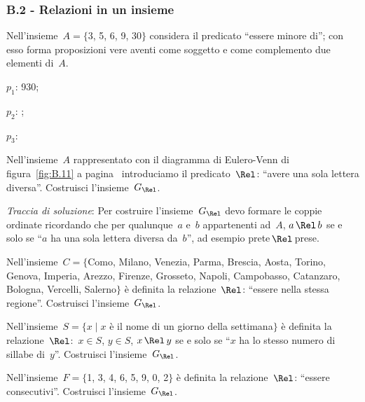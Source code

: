\begin{multicols}{2}
\subsubsection*{B.2 - Relazioni in un insieme}
\begin{esercizio}
\label{ese:B.2}
Nell'insieme~$A = \{$3, 5, 6, 9, 30$\}$ considera il predicato ``essere minore di''; con esso forma proposizioni vere aventi come soggetto e come complemento due elementi di~$A$.
\begin{enumeratea}
\item $p_1$: 930;
\item $p_2$: \dotfill;
\item $p_3$: \dotfill
\end{enumeratea}
\end{esercizio}

\begin{esercizio}
\label{ese:B.3}
Nell'insieme~$A$ rappresentato con il diagramma di Eulero-Venn di figura~\ref{fig:B.11} a pagina~\pageref{fig:B.11} introduciamo il predicato~$\Rel$: ``avere
una sola lettera diversa''. Costruisci l'insieme~$G_\Rel$.

\emph{Traccia di soluzione}:
Per costruire l'insieme~$G_\Rel$ devo formare le coppie ordinate ricordando che per qualunque~$a$ e~$b$ appartenenti ad~$A$, $a \,\Rel\, b$
se e solo se ``$a$ ha una sola lettera diversa da~$b$'', ad esempio prete$\,\Rel\,$prese.
\end{esercizio}

\begin{esercizio}
\label{ese:B.4}
Nell'insieme~$C = \{$Como, Milano, Venezia, Parma, Brescia, Aosta, Torino, Genova, Imperia, Arezzo,
Firenze, Grosseto, Napoli, Campobasso, Catanzaro, Bologna, Vercelli, Salerno$\}$ è definita la
relazione~$\Rel$: ``essere nella stessa regione''. Costruisci l'insieme~$G_\Rel$.
\end{esercizio}

\begin{esercizio}
\label{ese:B.5}
Nell'insieme~$S = \{ x \mid  x$ è il nome di un giorno della settimana$\}$ è definita la
relazione~$\Rel$:~$x \in S$, $y \in S$, $x \,\Rel\, y$ se e solo se ``$x$ ha
lo stesso numero di sillabe di~$y$''. Costruisci l'insieme~$G_\Rel$.
\end{esercizio}

\begin{esercizio}
\label{ese:B.6}
Nell'insieme~$F = \{$1, 3, 4, 6, 5, 9, 0, 2$\}$ è definita la relazione~$\Rel$: ``essere consecutivi''. Costruisci l'insieme~$G_\Rel$.
\end{esercizio}
\end{multicols}

